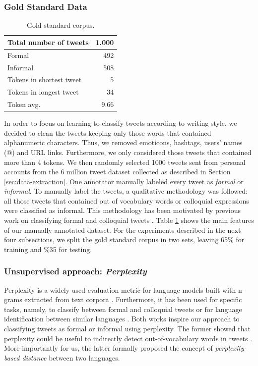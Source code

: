\documentclass[information,article,submit,moreauthors,pdftex,10pt,a4paper]{Definitions/mdpi}
\begin{document}
\subsubsection{Gold Standard Data}\label{sec:gold-standard-data}

\begin{table}[H]
  \centering
  \begin{tabular}{|l|r|} \hline
    Total number of tweets & 1.000 \\ \hline
    Formal & 492 \\ \hline
    Informal & 508 \\ \hline
    Tokens in shortest tweet & 5 \\ \hline
    Tokens in longest tweet & 34 \\ \hline
    Token avg. & 9.66 \\ \hline
  \end{tabular}
  \caption{Gold standard corpus.}
  \label{tab:gold-corpus}
\end{table}


In order to focus on learning to classify tweets according to writing style, we decided to clean the tweets keeping only those words that contained alphanumeric characters. Thus, we removed emoticons, hashtags, users' names (@) and URL links. Furthermore, we only considered those tweets that contained more than 4 tokens. We then randomly selected 1000 tweets sent from personal accounts from the 6 million tweet dataset collected as described in Section \ref{sec:data-extraction}. One annotator manually labeled every tweet as \emph{formal} or \emph{informal}. To manually label the tweets, a qualitative methodology was followed: all those tweets that contained out of vocabulary words or colloquial expressions were classified as informal. This methodology has been motivated by previous work on classifying formal and colloquial tweets \cite{gonzalez2015analysis}. Table \ref{tab:gold-corpus} shows the main features of our manually annotated dataset. For the experiments described in the next four subsections, we split the gold standard corpus in two sets, leaving 65\% for training and \%35 for testing.

\subsubsection{Unsupervised approach: \textit{Perplexity}}\label{sec:unsup-appr-text}

Perplexity is a widely-used evaluation metric for language models built with n-grams extracted from text corpora \cite{chen1999empirical}. Furthermore, it has been used for specific tasks, namely, to classify between formal and colloquial tweets \cite{gonzalez2015analysis} or for language identification between similar languages \cite{gamallo2017language}. Both works inspire our approach to classifying tweets as formal or informal using perplexity. The former showed that perplexity could be useful to indirectly detect out-of-vocabulary words in tweets \cite{gonzalez2015analysis}. More importantly for us, the latter formally proposed the concept of \emph{perplexity-based distance} between two languages.
\end{document}
